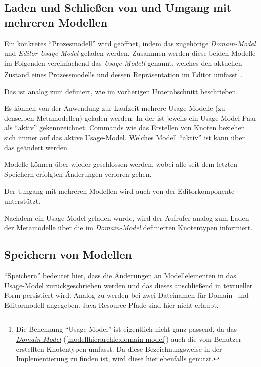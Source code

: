 \documentclass[a4paper,10pt]{sphinxmanual}
\begin{document}
\subsection{Laden und Schließen von und Umgang mit mehreren Modellen}
\label{modellanbindung:laden-und-schlieszen-von-und-umgang-mit-mehreren-modellen}
Ein konkretes "`Prozesmodell"' wird geöffnet, indem das zugehörige \emph{Domain-Model} und \emph{Editor-Usage-Model} geladen werden.
Zusammen werden diese beiden Modelle im Folgenden vereinfachend das \emph{Usage-Modell} genannt, welches den aktuellen Zustand eines Prozessmodells und dessen Repräsentation im Editor umfasst\footnote{
Die Benennung "`Usage-Model"' ist eigentlich nicht ganz passend, da das {\hyperref[modellhierarchie:domain-model]{\emph{Domain-Model}}} (\autoref*{modellhierarchie:domain-model}) auch die vom Benutzer erstellten Knotentypen umfasst. Da diese Bezeichnungsweise in der Implementierung zu finden ist, wird diese hier ebenfalls genutzt.
}.

Das   ist analog zum   definiert, wie im vorherigen Unterabschnitt beschrieben.

Es können von der Anwendung zur Laufzeit mehrere Usage-Modelle (zu denselben Metamodellen) geladen werden.
In der  ist jeweils ein Usage-Model-Paar als "`aktiv"' gekennzeichnet.
Commands wie das Erstellen von Knoten beziehen sich immer auf das aktive Usage-Model. Welches Modell "`aktiv"' ist kann über das   geändert werden.

Modelle können über  wieder geschlossen werden, wobei alle seit dem letzten Speichern erfolgten Änderungen verloren gehen.

Der Umgang mit mehreren Modellen wird auch von der Editorkomponente unterstützt.

Nachdem ein Usage-Model geladen wurde, wird der Aufrufer analog zum Laden der Metamodelle über die im \emph{Domain-Model} definierten Knotentypen informiert.


\subsection{Speichern von Modellen}
\label{modellanbindung:speichern-von-modellen}
"`Speichern"' bedeutet hier, dass die Änderungen an Modellelementen in das Usage-Model zurückgeschrieben werden und das dieses anschließend in textueller Form persistiert wird.
Analog zu  werden bei  zwei Dateinamen für Domain- und Editormodell angegeben. Java-Resource-Pfade sind hier nicht erlaubt.
\end{document}
